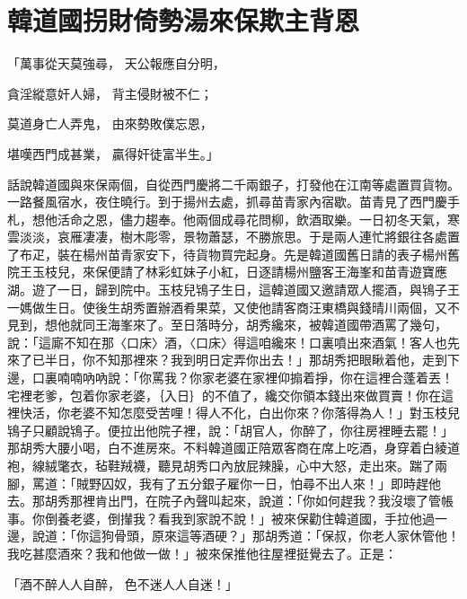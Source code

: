 %

\chapter{韓道國拐財倚勢\KG 湯來保欺主背恩}


\begin{showcontents}{}



「萬事從天莫強尋，  天公報應自分明，

貪淫縱意奸人婦，  背主侵財被不仁；

莫道身亡人弄鬼，  由來勢敗僕忘恩，

堪嘆西門成甚業，  贏得奸徒富半生。」

話說韓道國與來保兩個，自從西門慶將二千兩銀子，打發他在江南等處置買貨物。一路餐風宿水，夜住曉行。到于揚州去處，抓尋苗青家內宿歇。苗青見了西門慶手札，想他活命之恩，儘力趨奉。他兩個成尋花問柳，飲酒取樂。一日初冬天氣，寒雲淡淡，哀雁凄凄，樹木彫零，景物蕭瑟，不勝旅思。于是兩人連忙將銀往各處置了布疋，裝在楊州苗青家安下，待貨物買完起身。先是韓道國舊日請的表子楊州舊院王玉枝兒，來保便請了林彩虹妹子小紅，日逐請楊州鹽客王海峯和苗青遊寶應湖。遊了一日，歸到院中。玉枝兒鴇子生日，這韓道國又邀請眾人擺酒，與鴇子王一媽做生日。使後生胡秀置辦酒肴果菜，又使他請客商汪東橋與錢晴川兩個，又不見到，想他就同王海峯來了。至日落時分，胡秀纔來，被韓道國帶酒罵了幾句，說：「這廝不知在那〈口床〉酒，〈口床〉得這咱纔來！口裏噴出來酒氣！客人也先來了已半日，你不知那裡來？我到明日定弄你出去！」那胡秀把眼瞅着他，走到下邊，口裏喃喃吶吶說：「你罵我？你家老婆在家裡仰搧着掙，你在這裡合蓬着丟！宅裡老爹，包着你家老婆，｛入日｝的不值了，纔交你領本錢出來做買賣！你在這裡快活，你老婆不知怎麼受苦哩！得人不化，白出你來？你落得為人！」對玉枝兒鴇子只顧說鴇子。便拉出他院子裡，說：「胡官人，你醉了，你往房裡睡去罷！」那胡秀大腰小喝，白不進房來。不料韓道國正陪眾客商在席上吃酒，身穿着白綾道袍，線絨氅衣，毡鞋羢襪，聽見胡秀口內放屁辣臊，心中大怒，走出來。踹了兩腳，罵道：「賊野囚奴，我有了五分銀子雇你一日，怕尋不出人來！」即時趕他去。那胡秀那裡肯出門，在院子內聲叫起來，說道：「你如何趕我？我沒壞了管帳事。你倒養老婆，倒攆我？看我到家說不說！」被來保勸住韓道國，手拉他過一邊，說道：「你這狗骨頭，原來這等酒硬？」那胡秀道：「保叔，你老人家休管他！我吃甚麼酒來？我和他做一做！」被來保推他往屋裡挺覺去了。正是：

「酒不醉人人自醉，  色不迷人人自迷！」


\end{showcontents}
